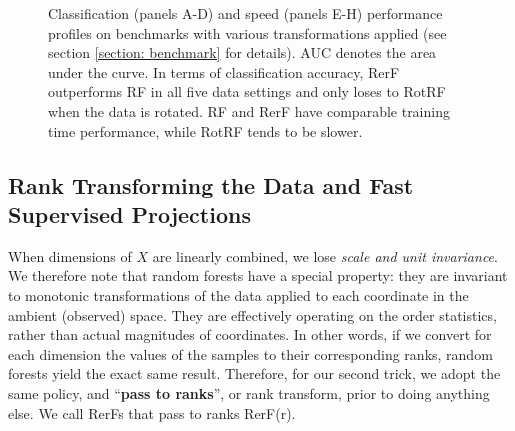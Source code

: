\documentclass{article}
\begin{document}
\begin{figure}[ht]
\begin{center}
\caption{Classification (panels A-D) and speed (panels E-H) performance profiles on benchmarks with various transformations applied (see section \ref{section: benchmark} for details). AUC denotes the area under the curve. In terms of classification accuracy, RerF outperforms RF in all five data settings and only loses to RotRF when the data is rotated. RF and RerF have comparable training time performance, while RotRF tends to be slower.}
\label{benchmark}
\end{center}
\vskip -0.2in
\end{figure}

\subsection{Rank Transforming the Data and Fast Supervised Projections}
\label{section: additions}

When dimensions of $X$ are linearly combined, we lose {\em{scale and unit invariance}}. We therefore note that random forests have a special property: they are invariant to monotonic transformations of the data applied to each coordinate in the ambient (observed) space. They are effectively operating on the order statistics, rather than actual magnitudes of coordinates. In other words, if we convert for each dimension the values of the samples to their corresponding ranks, random forests yield the exact same result. Therefore, for our second trick, we adopt the same policy, and ``{\bf{pass to ranks}}'', or rank transform,  prior to doing anything else. We call RerFs that pass to ranks RerF(r).
\end{document}
